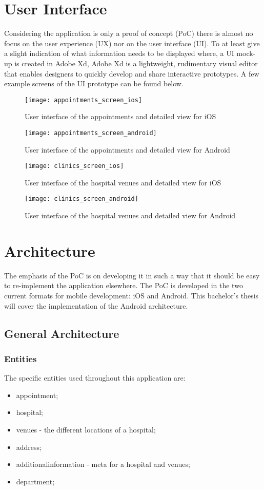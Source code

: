 \section{User Interface}
Considering the application is only a proof of concept (PoC) there is almost no focus on the user experience (UX) nor on the user interface (UI). To at least give a slight indication of what information needs to be displayed where, a UI mock-up is created in Adobe Xd, Adobe Xd is a lightweight, rudimentary visual editor that enables designers to quickly develop and share interactive prototypes. A few example screens of the UI prototype can be found below.
\begin{figure}[H]
\centering
\texttt{[image: appointments\_screen\_ios]}
\caption{User interface of the appointments and detailed view for iOS}
\end{figure}
\begin{figure}[H]
\centering
\texttt{[image: appointments\_screen\_android]}
\caption{User interface of the appointments and detailed view for Android}
\end{figure}
\begin{figure}[H]
\centering
\texttt{[image: clinics\_screen\_ios]}
\caption{User interface of the hospital venues and detailed view for iOS}
\end{figure}
\begin{figure}[H]
\centering
\texttt{[image: clinics\_screen\_android]}
\caption{User interface of the hospital venues and detailed view for Android}
\end{figure}
\section{Architecture}
The emphasis of the PoC is on developing it in such a way that it should be easy to re-implement the application elsewhere. The PoC is developed in the two current formats for mobile development: iOS and Android. This bachelor's thesis will cover the implementation of the Android architecture.
\subsection{General Architecture}
\subsubsection{Entities}
The specific entities used throughout this application are:
\begin{itemize}
\item appointment;
\item hospital;
\item venues - the different locations of a hospital;
\item address;
\item additionalinformation - meta for a hospital and venues;
\item department;
\end{itemize}
